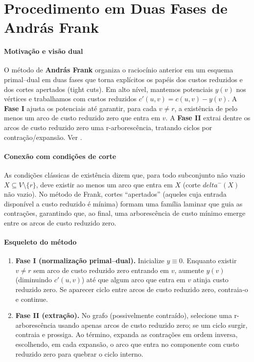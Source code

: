 \documentclass[12pt,a4paper]{article}
\def\emph#1{#1}%
\def\delta{delta}%
\begin{document}
\section{Procedimento em Duas Fases de András Frank}

\paragraph{Motivação e visão dual}
O método de \textbf{András Frank} organiza o raciocínio anterior em um \emph{esquema primal–dual em duas fases} que torna explícitos os papéis dos \emph{custos reduzidos} e dos \emph{cortes apertados} (tight cuts). Em alto nível, mantemos potenciais \(y(v)\) nos vértices e trabalhamos com custos reduzidos \(c'(u,v)=c(u,v)-y(v)\). A \textbf{Fase I} ajusta os potenciais até garantir, para cada \(v\neq r\), a existência de pelo menos um arco de custo reduzido zero que \emph{entra} em \(v\). A \textbf{Fase II} extrai dentre os arcos de custo reduzido zero uma r-arborescência, tratando ciclos por contração/expansão. Ver \cite{frank2014,schrijver2003comb}.

\paragraph{Conexão com condições de corte}
As condições clássicas de existência dizem que, para todo subconjunto não vazio \(X\subseteq V\setminus\{r\}\), deve existir ao menos um arco que entra em \(X\) (corte \(\delta^-(X)\) não vazio). No método de Frank, cortes “apertados” (aqueles cuja entrada disponível a custo reduzido é mínima) formam uma família laminar que guia as contrações, garantindo que, ao final, uma arborescência de custo mínimo emerge entre os arcos de custo reduzido zero.

\paragraph{Esqueleto do método}
\begin{enumerate}\setlength{\itemsep}{2pt}
    \item \textbf{Fase I (normalização primal–dual).} Inicialize \(y\equiv 0\). Enquanto existir \(v\neq r\) sem arco de custo reduzido zero entrando em \(v\), aumente \(y(v)\) (diminuindo \(c'(u,v)\)) até que algum arco que entra em \(v\) atinja custo reduzido zero. Se aparecer ciclo entre arcos de custo reduzido zero, contraia-o e continue.
    \item \textbf{Fase II (extração).} No grafo (possivelmente contraído), selecione uma r-arborescência usando apenas arcos de custo reduzido zero; se um ciclo surgir, contraia e prossiga. Ao término, expanda as contrações em ordem inversa, escolhendo, em cada expansão, o arco que entra no componente com custo reduzido zero para quebrar o ciclo interno.
\end{enumerate}
\end{document}
